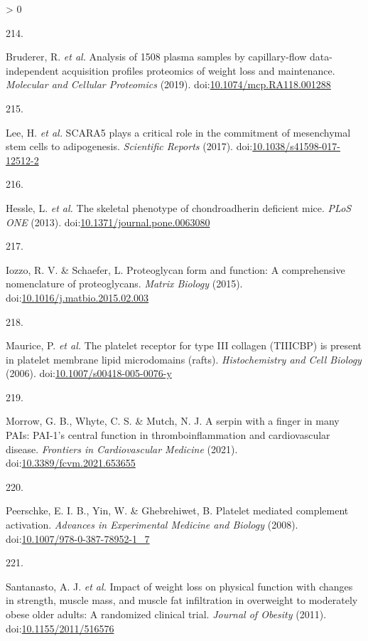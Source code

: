 \documentclass[11pt,twoside]{bristolthesis}
\newlength{\cslhangindent}
\newlength{\csllabelwidth}
\newenvironment{CSLReferences}[2] %
 {%
  \setlength{\parindent}{0pt}
  \ifodd #1 \everypar{\setlength{\hangindent}{\cslhangindent}}\ignorespaces\fi
  \ifnum #2 > 0
  \setlength{\parskip}{#2\baselineskip}
  \fi
 }%
 {}
\newcommand{\CSLLeftMargin}[1]{\parbox[t]{\csllabelwidth}{#1}}
\newcommand{\CSLRightInline}[1]{\parbox[t]{\linewidth - \csllabelwidth}{#1}\break}
\begin{document}
\begin{CSLReferences}{0}{0}
\leavevmode\hypertarget{ref-Bruderer2019}{}%
\CSLLeftMargin{214. }
\CSLRightInline{Bruderer, R. \emph{et al.} Analysis of 1508 plasma samples by capillary-flow data-independent acquisition profiles proteomics of weight loss and maintenance. \emph{Molecular and Cellular Proteomics} (2019). doi:\href{https://doi.org/10.1074/mcp.RA118.001288}{10.1074/mcp.RA118.001288}}

\leavevmode\hypertarget{ref-Lee2017a}{}%
\CSLLeftMargin{215. }
\CSLRightInline{Lee, H. \emph{et al.} SCARA5 plays a critical role in the commitment of mesenchymal stem cells to adipogenesis. \emph{Scientific Reports} (2017). doi:\href{https://doi.org/10.1038/s41598-017-12512-2}{10.1038/s41598-017-12512-2}}

\leavevmode\hypertarget{ref-Hessle2013}{}%
\CSLLeftMargin{216. }
\CSLRightInline{Hessle, L. \emph{et al.} The skeletal phenotype of chondroadherin deficient mice. \emph{PLoS ONE} (2013). doi:\href{https://doi.org/10.1371/journal.pone.0063080}{10.1371/journal.pone.0063080}}

\leavevmode\hypertarget{ref-Iozzo2015}{}%
\CSLLeftMargin{217. }
\CSLRightInline{Iozzo, R. V. \& Schaefer, L. Proteoglycan form and function: A comprehensive nomenclature of proteoglycans. \emph{Matrix Biology} (2015). doi:\href{https://doi.org/10.1016/j.matbio.2015.02.003}{10.1016/j.matbio.2015.02.003}}

\leavevmode\hypertarget{ref-Maurice2006}{}%
\CSLLeftMargin{218. }
\CSLRightInline{Maurice, P. \emph{et al.} The platelet receptor for type III collagen (TIIICBP) is present in platelet membrane lipid microdomains (rafts). \emph{Histochemistry and Cell Biology} (2006). doi:\href{https://doi.org/10.1007/s00418-005-0076-y}{10.1007/s00418-005-0076-y}}

\leavevmode\hypertarget{ref-Morrow2021}{}%
\CSLLeftMargin{219. }
\CSLRightInline{Morrow, G. B., Whyte, C. S. \& Mutch, N. J. A serpin with a finger in many PAIs: PAI-1's central function in thromboinflammation and cardiovascular disease. \emph{Frontiers in Cardiovascular Medicine} (2021). doi:\href{https://doi.org/10.3389/fcvm.2021.653655}{10.3389/fcvm.2021.653655}}

\leavevmode\hypertarget{ref-Peerschke2008}{}%
\CSLLeftMargin{220. }
\CSLRightInline{Peerschke, E. I. B., Yin, W. \& Ghebrehiwet, B. Platelet mediated complement activation. \emph{Advances in Experimental Medicine and Biology} (2008). doi:\href{https://doi.org/10.1007/978-0-387-78952-1_7}{10.1007/978-0-387-78952-1\_7}}

\leavevmode\hypertarget{ref-Santanasto2011}{}%
\CSLLeftMargin{221. }
\CSLRightInline{Santanasto, A. J. \emph{et al.} Impact of weight loss on physical function with changes in strength, muscle mass, and muscle fat infiltration in overweight to moderately obese older adults: A randomized clinical trial. \emph{Journal of Obesity} (2011). doi:\href{https://doi.org/10.1155/2011/516576}{10.1155/2011/516576}}


\end{CSLReferences}
\end{document}
